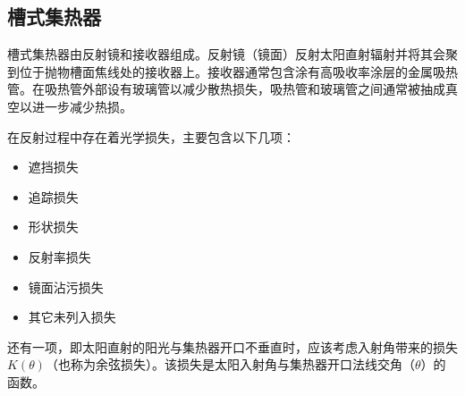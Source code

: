 \subsection{槽式集热器}
\label{sec:ptc}

槽式集热器由反射镜和接收器组成。反射镜（镜面）反射太阳直射辐射并将其会聚到位于抛物槽面焦线处的接收器上。接收器通常包含涂有高吸收率涂层的金属吸热管。在吸热管外部设有玻璃管以减少散热损失，吸热管和玻璃管之间通常被抽成真空以进一步减少热损。

在反射过程中存在着光学损失，主要包含以下几项\cite{Price2002}：

\begin{itemize}
  \item 遮挡损失
  \item 追踪损失
  \item 形状损失
  \item 反射率损失
  \item 镜面沾污损失
  \item 其它未列入损失
\end{itemize}

还有一项，即太阳直射的阳光与集热器开口不垂直时，应该考虑入射角带来的损失$K(\theta)$（也称为余弦损失）。该损失是太阳入射角与集热器开口法线交角（$\theta$）的函数。

